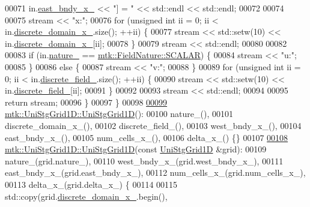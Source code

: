 \begin{DoxyCode}
00071   in.\hyperlink{classmtk_1_1UniStgGrid1D_a69a7d6be3171e53177e476348d04f4ae}{east\_bndy\_x\_} << \textcolor{stringliteral}{"] = "} << std::endl << std::endl;
00072 
00074 
00075   stream << \textcolor{stringliteral}{"x:"};
00076   \textcolor{keywordflow}{for} (\textcolor{keywordtype}{unsigned} \textcolor{keywordtype}{int} ii = 0; ii < in.\hyperlink{classmtk_1_1UniStgGrid1D_a0a1f9c00e21659e05f414dd97e2a52e3}{discrete\_domain\_x\_}.size(); ++ii) \{
00077     stream << std::setw(10) << in.\hyperlink{classmtk_1_1UniStgGrid1D_a0a1f9c00e21659e05f414dd97e2a52e3}{discrete\_domain\_x\_}[ii];
00078   \}
00079   stream << std::endl;
00080 
00082 
00083   \textcolor{keywordflow}{if} (in.\hyperlink{classmtk_1_1UniStgGrid1D_a061b66c92532b1498ce0e15418754911}{nature\_} == \hyperlink{namespacemtk_ga4c54f2a329cfb4e56213b02a259d19e2a8f3d9a4b6a7b7f2c7afa61ca113d0db9}{mtk::FieldNature::SCALAR}) \{
00084     stream << \textcolor{stringliteral}{"u:"};
00085   \}
00086   \textcolor{keywordflow}{else} \{
00087     stream << \textcolor{stringliteral}{"v:"};
00088   \}
00089   \textcolor{keywordflow}{for} (\textcolor{keywordtype}{unsigned} \textcolor{keywordtype}{int} ii = 0; ii < in.\hyperlink{classmtk_1_1UniStgGrid1D_a7379a5c6d16210cdd61ffa731bc47edc}{discrete\_field\_}.size(); ++ii) \{
00090     stream << std::setw(10) << in.\hyperlink{classmtk_1_1UniStgGrid1D_a7379a5c6d16210cdd61ffa731bc47edc}{discrete\_field\_}[ii];
00091   \}
00092 
00093   stream << std::endl;
00094 
00095   \textcolor{keywordflow}{return} stream;
00096 \}
00097 \}
00098 
\hypertarget{mtk__uni__stg__grid__1d_8cc_source_l00099}{}\hyperlink{classmtk_1_1UniStgGrid1D_ab0c1bb8afad2420fdb4434eb21bdec82}{00099} \hyperlink{classmtk_1_1UniStgGrid1D_ab0c1bb8afad2420fdb4434eb21bdec82}{mtk::UniStgGrid1D::UniStgGrid1D}():
00100     nature\_(),
00101     discrete\_domain\_x\_(),
00102     discrete\_field\_(),
00103     west\_bndy\_x\_(),
00104     east\_bndy\_x\_(),
00105     num\_cells\_x\_(),
00106     delta\_x\_() \{\}
00107 
\hypertarget{mtk__uni__stg__grid__1d_8cc_source_l00108}{}\hyperlink{classmtk_1_1UniStgGrid1D_a56d698e803070d96601b46f470bfef0b}{00108} \hyperlink{classmtk_1_1UniStgGrid1D_ab0c1bb8afad2420fdb4434eb21bdec82}{mtk::UniStgGrid1D::UniStgGrid1D}(\textcolor{keyword}{const} 
      \hyperlink{classmtk_1_1UniStgGrid1D}{UniStgGrid1D} &grid):
00109     nature\_(grid.nature\_),
00110     west\_bndy\_x\_(grid.west\_bndy\_x\_),
00111     east\_bndy\_x\_(grid.east\_bndy\_x\_),
00112     num\_cells\_x\_(grid.num\_cells\_x\_),
00113     delta\_x\_(grid.delta\_x\_) \{
00114 
00115     std::copy(grid.\hyperlink{classmtk_1_1UniStgGrid1D_a0a1f9c00e21659e05f414dd97e2a52e3}{discrete\_domain\_x\_}.begin(),

\end{DoxyCode}
